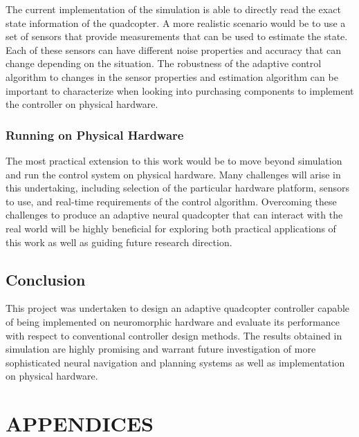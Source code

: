 \documentclass[letterpaper,12pt,titlepage,oneside,final]{book}
\begin{document}
The current implementation of the simulation is able to directly read the exact state information of the quadcopter.
A more realistic scenario would be to use a set of sensors that provide measurements that can be used to estimate the state.
Each of these sensors can have different noise properties and accuracy that can change depending on the situation.
The robustness of the adaptive control algorithm to changes in the sensor properties and estimation algorithm can be important to characterize when looking into purchasing components to implement the controller on physical hardware.


\subsection{Running on Physical Hardware}

The most practical extension to this work would be to move beyond simulation and run the control system on physical hardware.
Many challenges will arise in this undertaking, including selection of the particular hardware platform, sensors to use, and real-time requirements of the control algorithm.
Overcoming these challenges to produce an adaptive neural quadcopter that can interact with the real world will be highly beneficial for exploring both practical applications of this work as well as guiding future research direction.

\section{Conclusion}

This project was undertaken to design an adaptive quadcopter controller capable of being implemented on neuromorphic hardware and evaluate its performance with respect to conventional controller design methods.
The results obtained in simulation are highly promising and warrant future investigation of more sophisticated neural navigation and planning systems as well as implementation on physical hardware.

\appendix

\chapter*{APPENDICES}
\end{document}

